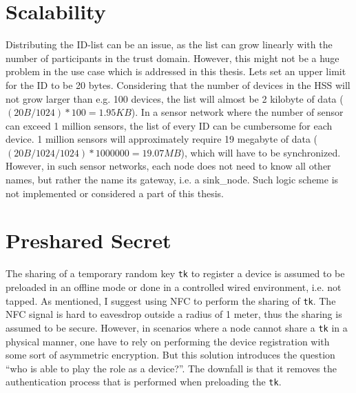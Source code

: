 \section{Scalability}
Distributing the \gls{ID}-list can be an issue, as the list can grow linearly with the number of participants in the trust domain.
However, this might not be a huge problem in the use case which is addressed in this thesis.
Lets set an upper limit for the ID to be 20 bytes. 
Considering that the number of devices in the \gls{HSS} will not grow larger than e.g. 100 devices, the list will almost be 2 kilobyte of data ($(20B / 1024) * 100 = 1.95KB$). 
In a sensor network where the number of sensor can exceed 1 million sensors, the list of every ID can be cumbersome for each device.
1 million sensors will approximately require 19 megabyte of data ($(20B / 1024 / 1024) * 1 000 000 = 19.07MB$), which will have to be synchronized.
However, in such sensor networks, each node does not need to know all other names, but rather the name its gateway, i.e. a \gls{sink_node}. 
Such logic scheme is not implemented or considered a part of this thesis.

\section{Preshared Secret}
The sharing of a temporary random key \texttt{tk} to register a device is assumed to be preloaded in an offline mode or done in a controlled wired environment, i.e. not tapped. 
As mentioned, I suggest using \gls{NFC} to perform the sharing of \texttt{tk}.
The \gls{NFC} signal is hard to eavesdrop outside a radius of 1 meter, thus the sharing is assumed to be secure.
However, in scenarios where a node cannot share a \texttt{tk} in a physical manner, one have to rely on performing the device registration with some sort of asymmetric encryption. 
But this solution introduces the question ``who is able to play the role as a device?''.
The downfall is that it removes the authentication process that is performed when preloading the \texttt{tk}.

